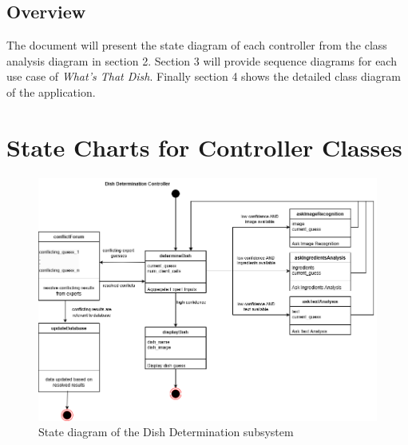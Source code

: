 \documentclass[]{article}
\begin{document}

\subsection{Overview}
\label{sub:overview}
The document will present the state diagram of each controller from the class analysis diagram in section 2.
Section 3 will provide sequence diagrams for each use case of \textit{What's That Dish}.
Finally section 4 shows the detailed class diagram of the application.



\section{State Charts for Controller Classes}
\label{sec:state_charts_for_controller_classes}
\begin{figure}[H]
	\centering
	\includegraphics[width=\textwidth]{image/D3_state_diagrams/dish_determination.png}
	\caption{State diagram of the Dish Determination subsystem}
	\label{fig:dish_determination}
\end{figure}
\end{document}
